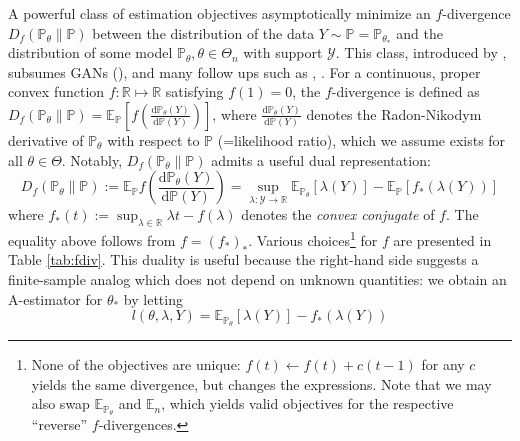 \documentclass[12pt]{article}
\def\D{\mathrm{d}}
\theoremstyle{myplain}
\theoremstyle{definition}
\theoremstyle{definition}
\theoremstyle{remark}
\numberwithin{equation}{section}
\begin{document}
A powerful class of estimation objectives asymptotically minimize an $f$-divergence $D_f(\mathbb{P}_\theta \| \mathbb{P})$ between the distribution of the data $Y\sim \mathbb{P}=\mathbb{P}_{\theta_*}$ and the distribution of some model $\mathbb{P}_\theta, \theta\in\Theta_n$ with support $\mathcal{Y}$. This class, introduced by \cite{nowozin2016fgan}, subsumes GANs (\cite{goodfellow2014generative}), and many follow ups such as \cite{mao2017squares}, \cite{chisqgan}. For a continuous, proper convex function $f: \mathbb{R}\mapsto \mathbb{R}$ satisfying $f(1)=0$, the $f$-divergence is defined as $D_f(\mathbb{P}_\theta \| \mathbb{P})=\mathbb{E}_\mathbb{P}[f(\frac{\D\mathbb{P}_\theta(Y)}{\D\mathbb{P}(Y)})]$, where $\frac{\D\mathbb{P}_\theta(Y)}{\D\mathbb{P}(Y)}$ denotes the Radon-Nikodym derivative of $\mathbb{P}_\theta$ with respect to $\mathbb{P}$ (=likelihood ratio), which we assume exists for all $\theta\in\Theta$. Notably, $D_f(\mathbb{P}_\theta \| \mathbb{P})$ admits a useful dual representation:
\begin{equation}
\label{eq:fdiv}
    D_f(\mathbb{P}_\theta \| \mathbb{P}) := \mathbb{E}_\mathbb{P} f\left(\frac{\D\mathbb{P}_\theta(Y)}{\D\mathbb{P}(Y)}\right) = \sup_{\lambda: \mathcal{Y} \to \mathbb{R}} \mathbb{E}_{\mathbb{P}_\theta}[\lambda(Y)] -  \mathbb{E}_\mathbb{P}[f_*(\lambda(Y))]
\end{equation}
where $f_*(t) := \sup_{\lambda\in\mathbb{R}} \lambda t-f(\lambda)$ denotes the {\it convex conjugate} of $f$. The equality above follows from $f=(f_*)_*$. Various choices\footnote{None of the objectives are unique: $f(t) \gets f(t)+c(t-1)$ for any $c$ yields the same divergence, but changes the expressions. Note that we may also swap $\mathbb{E}_{\mathbb{P}_\theta}$ and $\mathbb{E}_n$, which yields valid objectives for the respective ``reverse'' $f$-divergences.} for $f$ are presented in Table \ref{tab:fdiv}. This duality is useful because the right-hand side suggests a finite-sample analog which does not depend on unknown quantities: we obtain an A-estimator for $\theta_*$ by letting
\begin{equation}
\label{eq:fdivloss}
    l(\theta, \lambda, Y) = \mathbb{E}_{\mathbb{P}_{\theta}}[\lambda(Y)] -  f_*(\lambda(Y))
\end{equation}
\end{document}
